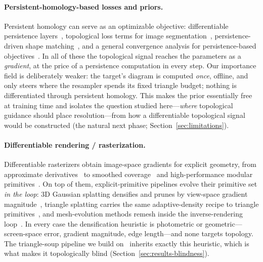 \paragraph{Persistent-homology-based losses and priors.}
Persistent homology can serve as an optimizable objective: differentiable
persistence layers~\cite{gabrielsson2020topologylayer}, topological loss terms
for image segmentation~\cite{hu2019topopreserving,clough2022topoloss},
persistence-driven shape matching~\cite{poulenard2018shapematching}, and a
general convergence analysis for persistence-based
objectives~\cite{carriere2021optimizing}. In all of these the topological
signal reaches the parameters as a \emph{gradient}, at the price of a
persistence computation in every step. Our importance field is deliberately
weaker: the target's diagram is computed \emph{once}, offline, and only steers
where the resampler spends its fixed triangle budget; nothing is
differentiated through persistent homology. This makes the prior essentially
free at training time and isolates the question studied here---\emph{where}
topological guidance should place resolution---from how a differentiable
topological signal would be constructed (the natural next phase;
Section~\ref{sec:limitations}).

\paragraph{Differentiable rendering / rasterization.}
Differentiable rasterizers obtain image-space gradients for explicit geometry,
from approximate derivatives~\cite{loper2014opendr,kato2018neural} to smoothed
coverage~\cite{liu2019softras} and high-performance modular
primitives~\cite{laine2020nvdiffrast}. On top of them, explicit-primitive
pipelines evolve their primitive set \emph{in the loop}: 3D Gaussian splatting
densifies and prunes by view-space gradient
magnitude~\cite{kerbl2023gaussians}, triangle splatting carries the same
adaptive-density recipe to triangle primitives~\cite{held2025trianglesplatting},
and mesh-evolution methods remesh inside the inverse-rendering
loop~\cite{nicolet2021largesteps,palfinger2022remeshing}. In every case the
densification heuristic is photometric or geometric---screen-space error,
gradient magnitude, edge length---and none targets topology. The triangle-soup
pipeline we build on~\cite{tojo2026diffsoup} inherits exactly this heuristic, which is what makes it
topologically blind (Section~\ref{sec:results-blindness}).

